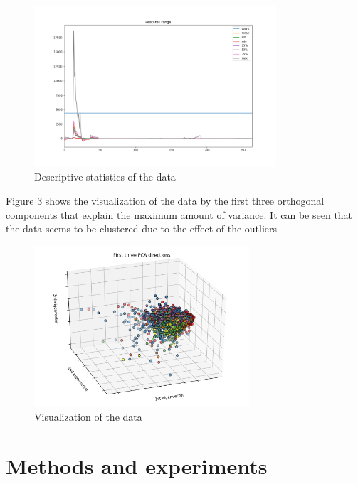 \documentclass[journal,twocolumn,letterpaper]{IEEEJERM}
\begin{document}
\begin{figure}[!t]
	\centering
	\includegraphics[height = 6cm]{featuresrange.png}
	\caption{Descriptive statistics of the data}
	\label{fig_sim2}
\end{figure}

Figure 3 shows the visualization of the data by the first three orthogonal components that explain the maximum amount of variance. It can be seen that the data seems to be clustered due to the effect of the outliers

\begin{figure}[!t]
	\centering
	\includegraphics[height = 6cm]{pca.png}
	\caption{Visualization of the data}
	\label{fig_sim3}
\end{figure}

\noindent 
\section{Methods and experiments}
\end{document}
